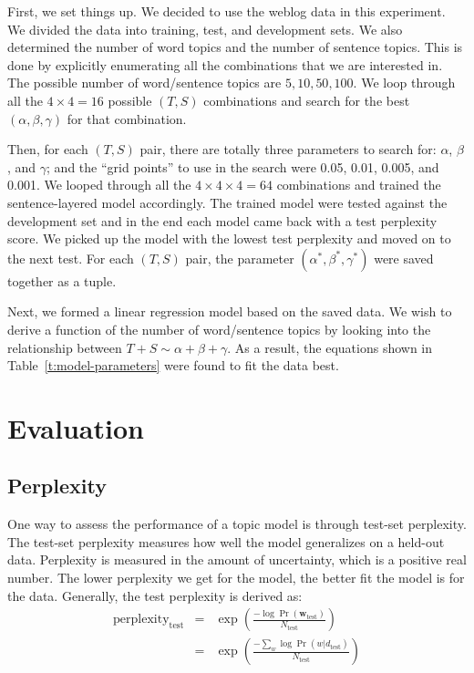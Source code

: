 First, we set things up.  We decided to use the weblog data in this experiment.
We divided the data into training, test, and development sets.  We also
determined the number of word topics and the number of sentence topics.  This
is done by explicitly enumerating all the combinations that we are interested
in.  The possible number of word/sentence topics are ${5, 10, 50, 100}$.   We
loop through all the $4 \times 4 = 16$ possible $(T,S)$ combinations and search
for the best $(\alpha, \beta, \gamma)$ for that combination.

Then, for each $(T, S)$ pair, there are totally three parameters to search for:
$\alpha$, $\beta$, and $\gamma$; and the ``grid points'' to use in the search
were 0.05, 0.01, 0.005, and 0.001.  We looped through all the $4 \times 4
\times 4 = 64$ combinations and trained the sentence-layered model accordingly.
The trained model were tested against the development set and in the end each
model came back with a test perplexity score.  We picked up the model with the
lowest test perplexity and moved on to the next test.  For each $(T, S)$ pair,
the parameter $(\alpha^*, \beta^*, \gamma^*)$ were saved together as a tuple.

Next, we formed a linear regression model based on the saved data.  We wish to
derive a function of the number of word/sentence topics by looking into the
relationship between $T + S \sim \alpha + \beta + \gamma$.  As a result, the
equations shown in Table~\ref{t:model-parameters} were found to fit the data
best.

\section{Evaluation} \label{s:evaluation}
\subsection{Perplexity} \label{ss:perplexity}

One way to assess the performance of a topic model is through test-set
perplexity.  The test-set perplexity measures how well the model generalizes on
a held-out data.  Perplexity is measured in the amount of uncertainty, which is
a positive real number.  The lower perplexity we get for the model, the better
fit the model is for the data.  Generally, the test perplexity is derived as:
\begin{eqnarray*} \mathrm{perplexity_{test}} &=& \exp(\frac{- \log
\Pr(\mathbf{w}_\mathrm{test})}{N_\mathrm{test}}) \\ &=& \exp(\frac{- \sum_w
\log \Pr(w|d_\mathrm{test})}{N_\mathrm{test}}) \end{eqnarray*}


